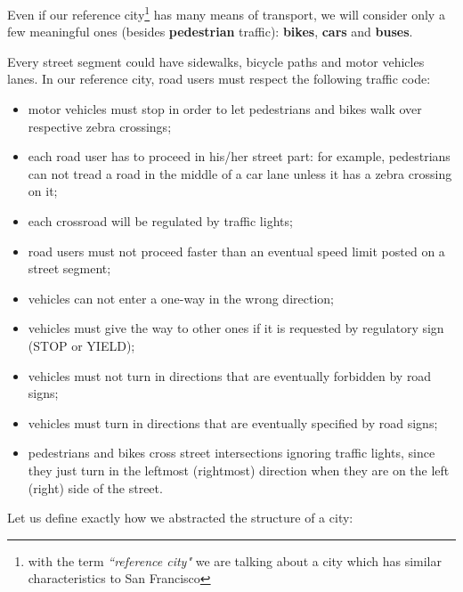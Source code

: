 Even if our reference city\footnote{with the term \emph{``reference city"}
we are talking about a city which has similar characteristics to San
Francisco} has many means of transport, we will consider only a few meaningful
ones (besides \textbf{pedestrian} traffic): \textbf{bikes}, \textbf{cars} and
\textbf{buses}.

Every street segment could have sidewalks, bicycle paths and motor vehicles
lanes. In our reference city, road users must respect the following traffic
code:

\begin{itemize}
\item motor vehicles must stop in order to let pedestrians and bikes walk over
  respective zebra crossings;
\item each road user has to proceed in his/her street part: for example,
  pedestrians can not tread a road in the middle of a car lane unless it has a
  zebra crossing on it;
\item each crossroad will be regulated by traffic lights;
\item road users must not proceed faster than an eventual speed limit posted
  on a street segment;
\item vehicles can not enter a one-way in the wrong direction;
\item vehicles must give the way to other ones if it is requested by
  regulatory sign (STOP or YIELD);
\item vehicles must not turn in directions that are eventually forbidden by
  road signs;
\item vehicles must turn in directions that are eventually specified by road
  signs;
\item pedestrians and bikes cross street intersections ignoring traffic lights,
  since they just turn in the leftmost (rightmost) direction when they are on
  the left (right) side of the street.
\end{itemize}

Let us define exactly how we abstracted the structure of a city:

